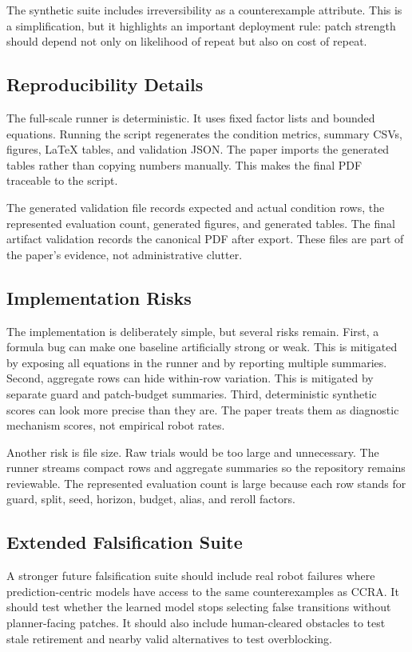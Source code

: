 \documentclass{article}
\newcommand{\ccra}{\textsc{CCRA}}
\begin{document}
The synthetic suite includes irreversibility as a counterexample attribute.
This is a simplification, but it highlights an important deployment rule:
patch strength should depend not only on likelihood of repeat but also on cost
of repeat.

\subsection{Reproducibility Details}

The full-scale runner is deterministic. It uses fixed factor lists and bounded
equations. Running the script regenerates the condition metrics, summary CSVs,
figures, LaTeX tables, and validation JSON. The paper imports the generated
tables rather than copying numbers manually. This makes the final PDF traceable
to the script.

The generated validation file records expected and actual condition rows, the
represented evaluation count, generated figures, and generated tables. The
final artifact validation records the canonical PDF after export. These files
are part of the paper's evidence, not administrative clutter.

\subsection{Implementation Risks}

The implementation is deliberately simple, but several risks remain. First, a
formula bug can make one baseline artificially strong or weak. This is mitigated
by exposing all equations in the runner and by reporting multiple summaries.
Second, aggregate rows can hide within-row variation. This is mitigated by
separate guard and patch-budget summaries. Third, deterministic synthetic
scores can look more precise than they are. The paper treats them as diagnostic
mechanism scores, not empirical robot rates.

Another risk is file size. Raw trials would be too large and unnecessary. The
runner streams compact rows and aggregate summaries so the repository remains
reviewable. The represented evaluation count is large because each row stands
for guard, split, seed, horizon, budget, alias, and reroll factors.

\subsection{Extended Falsification Suite}

A stronger future falsification suite should include real robot failures where
prediction-centric models have access to the same counterexamples as \ccra{}.
It should test whether the learned model stops selecting false transitions
without planner-facing patches. It should also include human-cleared obstacles
to test stale retirement and nearby valid alternatives to test overblocking.
\end{document}
